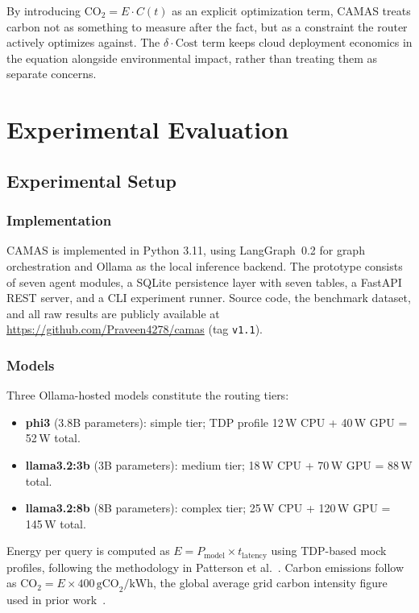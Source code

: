 \documentclass[journal]{IEEEtran}
\begin{document}
By introducing $\text{CO}_2 = E \cdot C(t)$ as an explicit optimization term,
CAMAS treats carbon not as something to measure after the fact, but as a
constraint the router actively optimizes against. The $\delta \cdot
\text{Cost}$ term keeps cloud deployment economics in the equation alongside
environmental impact, rather than treating them as separate concerns.

\section{Experimental Evaluation}

\subsection{Experimental Setup}

\subsubsection{Implementation}
CAMAS is implemented in Python 3.11, using LangGraph~0.2 for graph
orchestration and Ollama as the local inference backend. The prototype
consists of seven agent modules, a SQLite persistence layer with seven
tables, a FastAPI REST server, and a CLI experiment runner. Source code, the
benchmark dataset, and all raw results are publicly available at
\url{https://github.com/Praveen4278/camas} (tag \texttt{v1.1}).

\subsubsection{Models}
Three Ollama-hosted models constitute the routing tiers:
\begin{itemize}
    \item \textbf{phi3} (3.8B parameters): simple tier; TDP profile
          12\,W CPU + 40\,W GPU = 52\,W total.
    \item \textbf{llama3.2:3b} (3B parameters): medium tier;
          18\,W CPU + 70\,W GPU = 88\,W total.
    \item \textbf{llama3.2:8b} (8B parameters): complex tier;
          25\,W CPU + 120\,W GPU = 145\,W total.
\end{itemize}
Energy per query is computed as $E = P_{\text{model}} \times t_{\text{latency}}$
using TDP-based mock profiles, following the methodology in
Patterson et al.~\cite{patterson2021carbon}. Carbon emissions follow as
$\text{CO}_2 = E \times 400\,\text{gCO}_2\text{/kWh}$, the global average
grid carbon intensity figure used in prior work~\cite{kaufmann2023carbon}.
\end{document}
